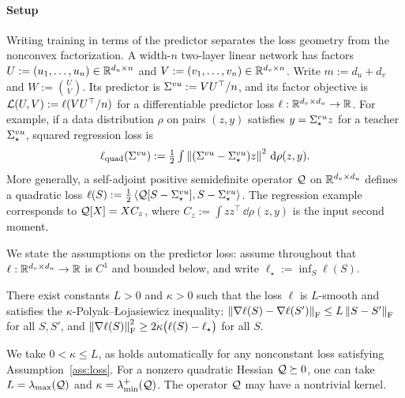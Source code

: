 
\label{sec:model}

\paragraph{Setup}
Writing training in terms of the predictor separates the loss geometry
from the nonconvex factorization.
A width-$n$ two-layer linear network has factors
$U:=(u_1,\ldots,u_n)\in\mathbb{R}^{d_u\times n}$ and
$V:=(v_1,\ldots,v_n)\in\mathbb{R}^{d_v\times n}$.
Write $m:=d_u+d_v$ and $W:=\binom UV$. Its predictor is
$\Sigma^{vu}:=VU^\top/n$, and its factor objective is
$\mathcal L(U,V):=\ell(VU^\top/n)$ for a differentiable predictor loss
$\ell:\mathbb{R}^{d_v\times d_u}\to\mathbb{R}$.
For example, if a data distribution $\rho$ on pairs $(z,y)$ satisfies
$y=\Sigma^{vu}_\star z$ for a teacher $\Sigma^{vu}_\star$, squared regression loss is
\[
  \textstyle \ell_{\rm quad}(\Sigma^{vu}):=\frac12\int\left\lVert (\Sigma^{vu}-\Sigma^{vu}_\star)z \right\rVert^2\,\mathrm{d}\rho(z,y).
\]
More generally, a self-adjoint positive semidefinite operator
$\mathcal Q$ on $\mathbb{R}^{d_v\times d_u}$ defines a quadratic loss
$\ell(S):=\frac12\left\langle \mathcal Q[S-\Sigma^{vu}_\star],S-\Sigma^{vu}_\star \right\rangle$.
The regression example corresponds to $\mathcal Q[X]=XC_z$, where
$C_z:=\int zz^\top\,\dd\rho(z,y)$ is the input second moment.

We state the assumptions on the predictor loss: assume throughout that \(\ell:\mathbb{R}^{d_v\times d_u}\to\mathbb{R}\) is \(C^1\) and bounded below, and write \(\ell_\star:=\inf_S\ell(S)\).

\begin{assumption}
\label{ass:predictor-loss}\label{ass:loss}
There exist constants \(L>0\) and \(\kappa>0\) such that the loss
\(\ell\) is \(L\)-smooth and satisfies the \(\kappa\)-Polyak--\L{}ojasiewicz
inequality: \(\left\lVert \nabla\ell(S)-\nabla\ell(S') \right\rVert_{\mathrm{F}}\le L\left\lVert S-S' \right\rVert_{\mathrm{F}}\) for all \(S,S'\),
and \(\left\lVert \nabla\ell(S) \right\rVert_{\mathrm{F}}^2 \ge 2\kappa\bigl(\ell(S)-\ell_\star\bigr)\) for all \(S\).
\end{assumption}

We take \(0<\kappa\le L\), as holds automatically for any nonconstant loss
satisfying Assumption~\ref{ass:loss}.
For a nonzero quadratic Hessian $\mathcal Q\succeq0$, one can take
$L=\lambda_{\max}(\mathcal Q)$ and $\kappa=\lambda_{\min}^{+}(\mathcal Q)$.
The operator $\mathcal Q$ may have a nontrivial kernel.

